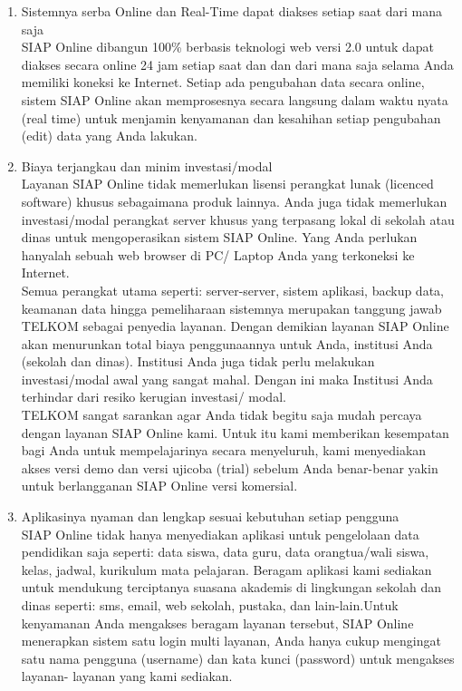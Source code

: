 \begin{enumerate}
\item Sistemnya serba Online dan Real-Time dapat diakses setiap saat dari mana saja\\
SIAP Online dibangun 100\% berbasis teknologi web versi 2.0 untuk dapat  diakses secara online 24 jam setiap saat dan dan dari mana saja selama Anda memiliki koneksi ke Internet. Setiap ada pengubahan data secara online, sistem SIAP Online akan memprosesnya secara langsung dalam waktu nyata (real time) untuk menjamin kenyamanan dan kesahihan setiap pengubahan (edit) data yang Anda lakukan.
\item Biaya terjangkau dan minim investasi/modal\\
Layanan SIAP Online tidak memerlukan lisensi perangkat lunak (licenced software) khusus sebagaimana produk lainnya. Anda juga tidak memerlukan investasi/modal perangkat server khusus yang terpasang lokal di sekolah atau dinas untuk mengoperasikan sistem SIAP Online. Yang Anda perlukan hanyalah sebuah web  browser di PC/ Laptop Anda yang terkoneksi ke Internet.\\
Semua perangkat utama seperti: server-server, sistem aplikasi, backup data, keamanan data hingga pemeliharaan sistemnya merupakan tanggung jawab TELKOM sebagai penyedia layanan. Dengan demikian layanan SIAP Online akan menurunkan total  biaya penggunaannya untuk Anda, institusi Anda (sekolah dan dinas). Institusi Anda juga tidak perlu melakukan investasi/modal awal yang sangat mahal. Dengan ini  maka  Institusi Anda terhindar dari resiko kerugian investasi/ modal.\\
TELKOM sangat sarankan agar Anda tidak begitu saja mudah percaya dengan layanan SIAP Online kami. Untuk itu kami memberikan kesempatan bagi Anda untuk mempelajarinya secara menyeluruh, kami menyediakan akses versi demo dan versi ujicoba (trial) sebelum Anda benar-benar yakin untuk berlangganan SIAP Online versi komersial.
\item Aplikasinya nyaman dan lengkap sesuai  kebutuhan setiap pengguna\\
SIAP Online tidak hanya menyediakan aplikasi untuk pengelolaan data pendidikan saja seperti: data siswa, data guru, data orangtua/wali siswa, kelas, jadwal, kurikulum mata pelajaran. Beragam aplikasi kami sediakan untuk mendukung terciptanya suasana akademis di lingkungan sekolah dan dinas seperti: sms, email, web sekolah,  pustaka,  dan lain-lain.Untuk kenyamanan Anda mengakses beragam layanan tersebut, SIAP Online menerapkan sistem satu login multi layanan, Anda hanya cukup mengingat satu nama pengguna (username) dan kata kunci (password) untuk mengakses layanan- layanan yang kami sediakan.\\

\end{enumerate}
